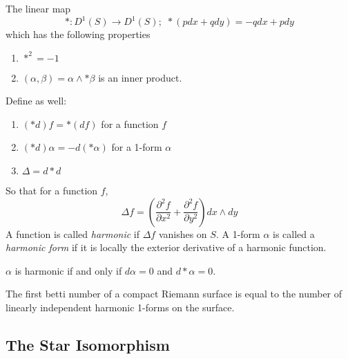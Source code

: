\begin{defn}

The linear map
\[
	*:D^1(S) \to D^1(S); \hspace{4pt} *(p dx + q dy) = -q dx + p dy
\]
which has the following properties
\begin{enumerate}
	\item $ *^2 = -1$
	\item $ \left( \alpha, \beta \right) = \alpha \wedge * \beta$ is an inner product.
\end{enumerate}
Define as well:
\begin{enumerate}
	\item $(*d)f = * (df)$ for a function $f$
	\item $ (*d) \alpha = - d( * \alpha)$ for a 1-form $ \alpha$
	\item $ \Delta = d*d$
\end{enumerate}
So that for a function $f$,
\[
	\Delta f = \left( \frac{ \partial^2 f}{\partial x^2 } + \frac{ \partial^2 f}{\partial y^2 }  \right) dx \wedge dy
\]
A function is called \textit{harmonic} if $ \Delta f$ vanishes on $S$. A 1-form $ \alpha$ is called a \textit{harmonic form} if it is locally the exterior derivative of a harmonic function.
\end{defn}

\begin{prop}

$ \alpha$ is harmonic if and only if $d \alpha = 0$ and $ d * \alpha = 0$.

\end{prop}

\begin{thm}

	The first betti number of a compact Riemann surface is equal to the number of linearly independent harmonic 1-forms on the surface.

\end{thm}

\subsection{The Star Isomorphism}






























